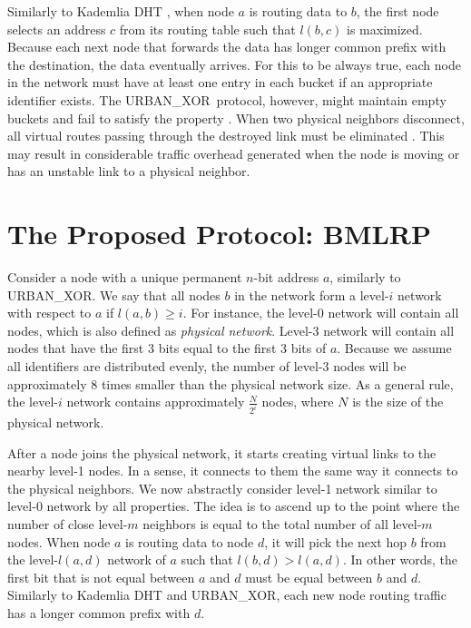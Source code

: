 \documentclass[conference]{IEEEtran}
\theoremstyle{definition}
\newcommand{\urbanxor}{URBAN\_XOR}
\begin{document}
Similarly to Kademlia DHT \cite{kademlia}, when node $a$ is routing data to $b$, the first node selects an address $c$ from its routing table such that $l(b,c)$ is maximized. Because each next node that forwards the data has longer common prefix with the destination, the data eventually arrives. For this to be always true, each node in the network must have at least one entry in each bucket if an appropriate identifier exists. The \urbanxor\ protocol, however, might maintain empty buckets and fail to satisfy the property \cite{Pasquini}. When two physical neighbors disconnect, all virtual routes passing through the destroyed link must be eliminated \cite{Pasquini}. This may result in considerable traffic overhead generated when the node is moving or has an unstable link to a physical neighbor.


\section{The Proposed Protocol:  BMLRP}
\label{sec:bmlrp}

Consider a node with a unique permanent $n$-bit address $a$, similarly to \urbanxor. We say that all nodes $b$ in the network form a level-$i$ network with respect to $a$ if $l(a,b) \ge i$. For instance, the level-0 network will contain all nodes, which is also defined as \emph{physical network}. Level-3 network will contain all nodes that have the first 3 bits equal to the first 3 bits of $a$. Because we assume all identifiers are distributed evenly, the number of level-3 nodes will be approximately 8 times smaller than the physical network size. As a general rule, the level-$i$ network contains approximately $\frac{N}{2^i}$ nodes, where $N$ is the size of the physical network.

After a node joins the physical network, it starts creating virtual links to the nearby level-1 nodes. In a sense, it connects to them the same way it connects to the physical neighbors. We now abstractly consider level-1 network similar to level-0 network by all properties. The idea is to ascend up to the point where the number of close level-$m$ neighbors is equal to the total number of all level-$m$ nodes. When node $a$ is routing data to node $d$, it will pick the next hop $b$ from the level-$l(a,d)$ network of $a$ such that $l(b,d) > l(a,d)$. In other words, the first bit that is not equal between $a$ and $d$ must be equal between $b$ and $d$. Similarly to Kademlia DHT and \urbanxor, each new node routing traffic has a longer common prefix with $d$.
\end{document}

